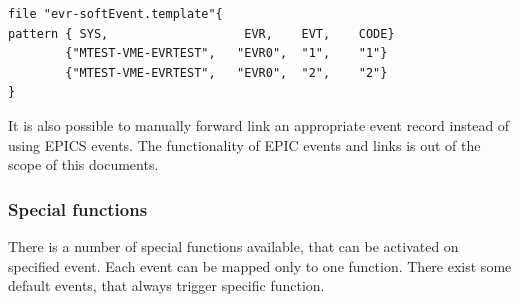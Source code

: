 \documentclass[12pt,a4paper]{article}
\begin{document}
\begin{verbatim}
file "evr-softEvent.template"{
pattern { SYS,                   EVR,    EVT,    CODE}
        {"MTEST-VME-EVRTEST",   "EVR0",  "1",    "1"}
        {"MTEST-VME-EVRTEST",   "EVR0",  "2",    "2"}
}
\end{verbatim}

It is also possible to manually forward link an appropriate event record instead of using EPICS events. The functionality of EPIC events and links is out of the scope of this documents.

\subsubsection{Special functions}\label{sec:Special functions}
There is a number of special functions available, that can be activated
on specified event. Each event can be mapped only to one function. There
exist some default events, that always trigger specific function.
\end{document}
